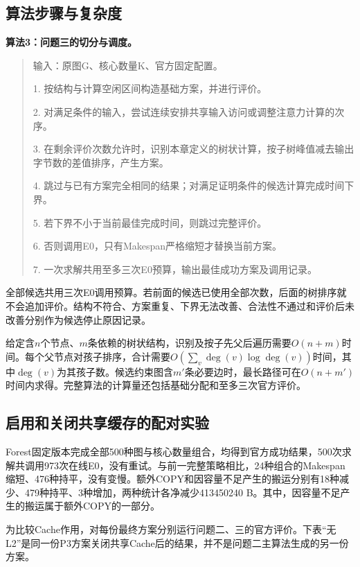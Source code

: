 \documentclass[anonymous,notoc]{gmcm2026}
\begin{document}
\subsection{算法步骤与复杂度}

\textbf{算法3：问题三的切分与调度。}

\begin{quote}
输入：原图G、核心数量K、官方固定配置。

1. 按结构与计算空闲区间构造基础方案，并进行评价。

2. 对满足条件的输入，尝试连续安排共享输入访问或调整注意力计算的次序。

3. 在剩余评价次数允许时，识别本章定义的树状计算，按子树峰值减去输出字节数的差值排序，产生方案。

4. 跳过与已有方案完全相同的结果；对满足证明条件的候选计算完成时间下界。

5. 若下界不小于当前最佳完成时间，则跳过完整评价。

6. 否则调用E0，只有Makespan严格缩短才替换当前方案。

7. 一次求解共用至多三次E0预算，输出最佳成功方案及调用记录。
\end{quote}

全部候选共用三次E0调用预算。若前面的候选已使用全部次数，后面的树排序就不会追加评价。结构不符合、方案重复、下界无法改善、合法性不通过和评价后未改善分别作为候选停止原因记录。

给定含\(n\)个节点、\(m\)条依赖的树状结构，识别及按子先父后遍历需要\(O(n+m)\)时间。每个父节点对孩子排序，合计需要\(O(\sum_v\deg(v)\log\deg(v))\)时间，其中\(\deg(v)\)为其孩子数。候选约束图含\(m'\)条必要边时，最长路径可在\(O(n+m')\)时间内求得。完整算法的计算量还包括基础分配和至多三次官方评价。

\subsection{启用和关闭共享缓存的配对实验}

Forest固定版本完成全部500种图与核心数量组合，均得到官方成功结果，500次求解共调用973次在线E0，没有重试。与前一完整策略相比，24种组合的Makespan缩短、476种持平，没有变慢。额外COPY和因容量不足产生的搬运分别有18种减少、479种持平、3种增加，两种统计各净减少413450240 B。其中，因容量不足产生的搬运属于额外COPY的一部分。

为比较Cache作用，对每份最终方案分别运行问题二、三的官方评价。下表``无L2''是同一份P3方案关闭共享Cache后的结果，并不是问题二主算法生成的另一份方案。
\end{document}
